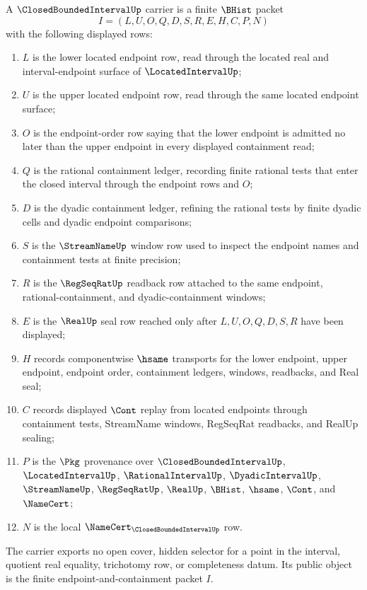 \begin{definition}
\label{def:closed-bounded-interval-carrier}
A $\ClosedBoundedIntervalUp$ carrier is a finite $\BHist$ packet
$$
I=(L,U,O,Q,D,S,R,E,H,C,P,N)
$$
with the following displayed rows:
\begin{enumerate}
\item $L$ is the lower located endpoint row, read through the located real and interval-endpoint surface of $\LocatedIntervalUp$;
\item $U$ is the upper located endpoint row, read through the same located endpoint surface;
\item $O$ is the endpoint-order row saying that the lower endpoint is admitted no later than the upper endpoint in every displayed containment read;
\item $Q$ is the rational containment ledger, recording finite rational tests that enter the closed interval through the endpoint rows and $O$;
\item $D$ is the dyadic containment ledger, refining the rational tests by finite dyadic cells and dyadic endpoint comparisons;
\item $S$ is the $\StreamNameUp$ window row used to inspect the endpoint names and containment tests at finite precision;
\item $R$ is the $\RegSeqRatUp$ readback row attached to the same endpoint, rational-containment, and dyadic-containment windows;
\item $E$ is the $\RealUp$ seal row reached only after $L,U,O,Q,D,S,R$ have been displayed;
\item $H$ records componentwise $\hsame$ transports for the lower endpoint, upper endpoint, endpoint order, containment ledgers, windows, readbacks, and Real seal;
\item $C$ records displayed $\Cont$ replay from located endpoints through containment tests, StreamName windows, RegSeqRat readbacks, and RealUp sealing;
\item $P$ is the $\Pkg$ provenance over $\ClosedBoundedIntervalUp$, $\LocatedIntervalUp$, $\RationalIntervalUp$, $\DyadicIntervalUp$, $\StreamNameUp$, $\RegSeqRatUp$, $\RealUp$, $\BHist$, $\hsame$, $\Cont$, and $\NameCert$;
\item $N$ is the local $\NameCert_{\ClosedBoundedIntervalUp}$ row.
\end{enumerate}
The carrier exports no open cover, hidden selector for a point in the interval, quotient real equality, trichotomy row, or completeness datum. Its public object is the finite endpoint-and-containment packet $I$.
\end{definition}

